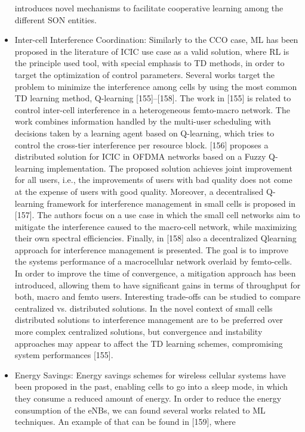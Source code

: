 \documentclass[12pt]{article}
\begin{document}
\begin{itemize}
	introduces novel mechanisms to facilitate cooperative learning
	among the different SON entities.
	\item Inter-cell Interference Coordination: Similarly to the
	CCO case, ML has been proposed in the literature of ICIC use
	case as a valid solution, where RL is the principle used tool,
	with special emphasis to TD methods, in order to target the
	optimization of control parameters. Several works target the
	problem to minimize the interference among cells by using the
	most common TD learning method, Q-learning [155]–[158].
	The work in [155] is related to control inter-cell interference in
	a heterogeneous femto-macro network. The work combines information
	handled by the multi-user scheduling with decisions
	taken by a learning agent based on Q-learning, which tries to
	control the cross-tier interference per resource block. [156]
	proposes a distributed solution for ICIC in OFDMA networks
	based on a Fuzzy Q-learning implementation. The proposed
	solution achieves joint improvement for all users, i.e., the
	improvements of users with bad quality does not come at the
	expense of users with good quality. Moreover, a decentralised
	Q-learning framework for interference management in small
	cells is proposed in [157]. The authors focus on a use case in
	which the small cell networks aim to mitigate the interference
	caused to the macro-cell network, while maximizing their own
	spectral efficiencies. Finally, in [158] also a decentralized Qlearning
	approach for interference management is presented.
	The goal is to improve the systems performance of a macrocellular
	network overlaid by femto-cells. In order to improve
	the time of convergence, a mitigation approach has been
	introduced, allowing them to have significant gains in terms
	of throughput for both, macro and femto users. Interesting
	trade-offs can be studied to compare centralized vs. distributed
	solutions. In the novel context of small cells distributed solutions
	to interference management are to be preferred over more
	complex centralized solutions, but convergence and instability
	approaches may appear to affect the TD learning schemes,
	compromising system performances [155].
	\item Energy Savings: Energy savings schemes for wireless
	cellular systems have been proposed in the past, enabling cells
	to go into a sleep mode, in which they consume a reduced
	amount of energy. In order to reduce the energy consumption
	of the eNBs, we can found several works related to ML
	techniques. An example of that can be found in [159], where

\end{itemize}
\end{document}
